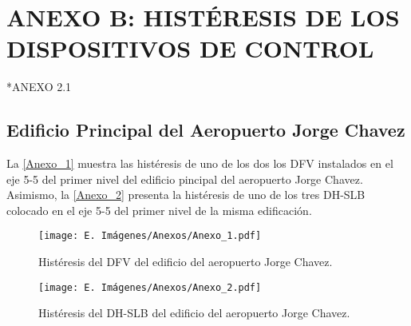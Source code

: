 \section*{ANEXO B: HISTÉRESIS DE LOS DISPOSITIVOS DE CONTROL}
{}

\lipsum[10]

*ANEXO 2.1

	\subsection*{Edificio Principal del Aeropuerto Jorge Chavez}
{}

La \autoref{Anexo_1} muestra las histéresis de uno de los dos los DFV instalados en el eje 5-5 del primer nivel del edificio pincipal del aeropuerto Jorge Chavez. Asimismo, la \autoref{Anexo_2} presenta la histéresis de uno de los tres DH-SLB colocado en el eje 5-5 del primer nivel de la misma edificación.


	\begin{figure}[!h]
	\centering
	\texttt{[image: E. Imágenes/Anexos/Anexo\_1.pdf]}
	\vspace{-8 mm}
	\caption[]{\centering\footnotesize Histéresis del DFV del edificio del aeropuerto Jorge Chavez.}
	\label{Anexo_1}
	\end{figure}	


	\begin{figure}[!h]
	\centering
	\texttt{[image: E. Imágenes/Anexos/Anexo\_2.pdf]}
	\vspace{-8 mm}
	\caption[]{\centering\footnotesize Histéresis del DH-SLB del edificio del aeropuerto Jorge Chavez.}
	\label{Anexo_2}
	\end{figure}	


